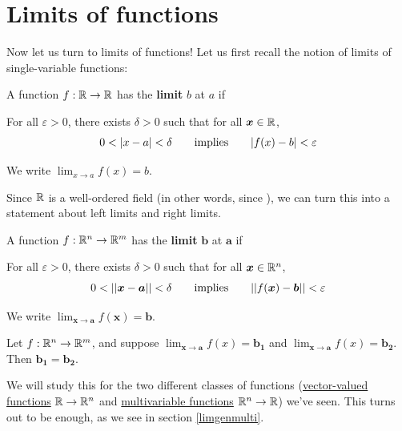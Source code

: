 \section{Limits of functions}




Now let us turn to limits of functions!  Let us first recall the notion of limits of single-variable functions:


\begin{definition}
    A function $f :\mathbb{R} \to \mathbb{R}$ has the \textbf{limit} $b$ at $a$ if
    
    \vspace{1em}
    For all $\varepsilon>0$, there exists $\delta > 0$ such that for all $\bm{x} \in \mathbb{R}$, $$0 < |x-a| < \delta \qquad \textnormal{implies} \qquad |f(x) - b | < \varepsilon$$
    
    We write $\lim_{x \to a}f(x) = b$.
    
    \end{definition}


Since $\mathbb{R}$ is a well-ordered field (in other words, since ), we can turn this into a statement about left limits and right limits.










\begin{definition}
    A function $f : \mathbb{R}^n \to \mathbb{R}^m$ has the \textbf{limit} $\bm{b}$ at $\bm{a}$ if
    
    \vspace{1em}
    For all $\varepsilon>0$, there exists $\delta > 0$ such that for all $\bm{x} \in \mathbb{R}^n$, $$0 < ||\bm{x} - \bm{a} || < \delta \qquad \textnormal{implies} \qquad ||f(\bm{x}) - \bm{b} || < \varepsilon$$
    
    We write $\lim_{\bm{x} \to \bm{a}}f(\bm{x}) = \bm{b}$.
    
    \end{definition}


    \begin{proposition}
    Let $f: \mathbb{R}^n \to \mathbb{R}^m$, and suppose $\lim_{\bm{x} \to \bm{a}}f(x) = \bm{b_1}$ and $\lim_{\bm{x} \to \bm{a}}f(x) = \bm{b_2}$.  Then $\bm{b_1} = \bm{b_2}$.
    \end{proposition}

We will study this for the two different classes of functions (\hyperref[limvectorval]{vector-valued functions} $\mathbb{R} \to \mathbb{R}^n$ and \hyperref[limmulti]{multivariable functions} $\mathbb{R}^n \to \mathbb{R}$)  we've seen.  This turns out to be enough, as we see in section \ref{limgenmulti}.















